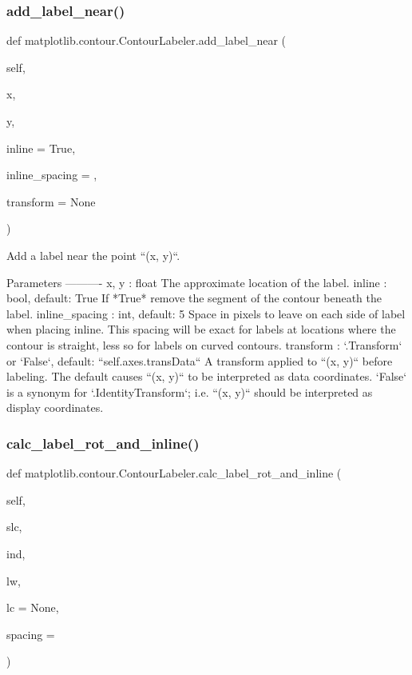 \subsubsection{\texorpdfstring{add\+\_\+label\+\_\+near()}{add\_label\_near()}}
{\footnotesize\ttfamily def matplotlib.\+contour.\+Contour\+Labeler.\+add\+\_\+label\+\_\+near (\begin{DoxyParamCaption}\item[{}]{self,  }\item[{}]{x,  }\item[{}]{y,  }\item[{}]{inline = {\ttfamily True},  }\item[{}]{inline\+\_\+spacing = {},  }\item[{}]{transform = {\ttfamily None} }\end{DoxyParamCaption})}

\begin{DoxyVerb}Add a label near the point ``(x, y)``.

Parameters
----------
x, y : float
    The approximate location of the label.
inline : bool, default: True
    If *True* remove the segment of the contour beneath the label.
inline_spacing : int, default: 5
    Space in pixels to leave on each side of label when placing
    inline. This spacing will be exact for labels at locations where
    the contour is straight, less so for labels on curved contours.
transform : `.Transform` or `False`, default: ``self.axes.transData``
    A transform applied to ``(x, y)`` before labeling.  The default
    causes ``(x, y)`` to be interpreted as data coordinates.  `False`
    is a synonym for `.IdentityTransform`; i.e. ``(x, y)`` should be
    interpreted as display coordinates.
\end{DoxyVerb}
 \mbox{\label{classmatplotlib_1_1contour_1_1ContourLabeler_aa03055e5f3a393a1bfb5a440aca5f6bf}} 
\subsubsection{\texorpdfstring{calc\+\_\+label\+\_\+rot\+\_\+and\+\_\+inline()}{calc\_label\_rot\_and\_inline()}}
{\footnotesize\ttfamily def matplotlib.\+contour.\+Contour\+Labeler.\+calc\+\_\+label\+\_\+rot\+\_\+and\+\_\+inline (\begin{DoxyParamCaption}\item[{}]{self,  }\item[{}]{slc,  }\item[{}]{ind,  }\item[{}]{lw,  }\item[{}]{lc = {\ttfamily None},  }\item[{}]{spacing = {} }\end{DoxyParamCaption})}

